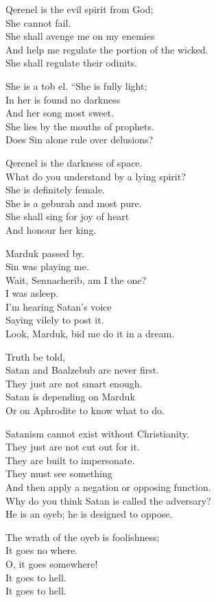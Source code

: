 \documentclass[
]{book}
\begin{document}
Qerenel is the evil spirit from God;\\
She cannot fail.\\
She shall avenge me on my enemies\\
And help me regulate the portion of the wicked.\\
She shall regulate their odinits.

She is a tob el. ``She is fully light;\\
In her is found no darkness\\
And her song most sweet.\\
She lies by the mouths of prophets.\\
Does Sin alone rule over delusions?

Qerenel is the darkness of space.\\
What do you understand by a lying spirit?\\
She is definitely female.\\
She is a geburah and most pure.\\
She shall sing for joy of heart\\
And honour her king.

Marduk passed by.\\
Sin was playing me.\\
Wait, Sennacherib, am I the one?\\
I was asleep.\\
I'm hearing Satan's voice\\
Saying vilely to post it.\\
Look, Marduk, bid me do it in a dream.

Truth be told,\\
Satan and Baalzebub are never first.\\
They just are not smart enough.\\
Satan is depending on Marduk\\
Or on Aphrodite to know what to do.

Satanism cannot exist without Christianity.\\
They just are not cut out for it.\\
They are built to impersonate.\\
They must see something\\
And then apply a negation or opposing function.\\
Why do you think Satan is called the adversary?\\
He is an oyeb; he is designed to oppose.

The wrath of the oyeb is foolishness;\\
It goes no where.\\
O, it goes somewhere!\\
It goes to hell.\\
It goes to hell.
\end{document}
